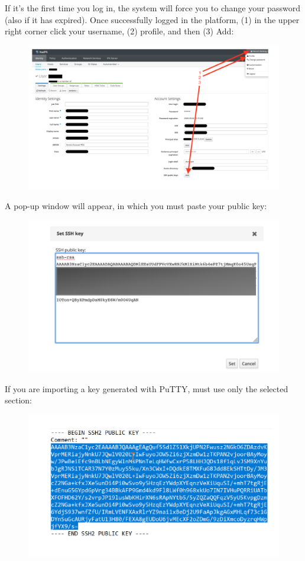 If it’s the first time you log in, the system will force you to change your password (also if it has expired).
Once successfully logged in the platform, (1) in the upper right corner click your username, (2) profile, and
then (3) Add:


\begin{figure}
  \includegraphics[width=15cm]{Images/example13.png}
\end{figure}

\newpage

A pop-up window will appear, in which you must paste your public key:

\begin{figure}
  \includegraphics[width=15cm]{Images/example14.png}
\end{figure}

If you are importing a key generated with PuTTY, must use only the selected section:

\begin{figure}
  \includegraphics[width=15cm]{Images/example15.png}
\end{figure}

